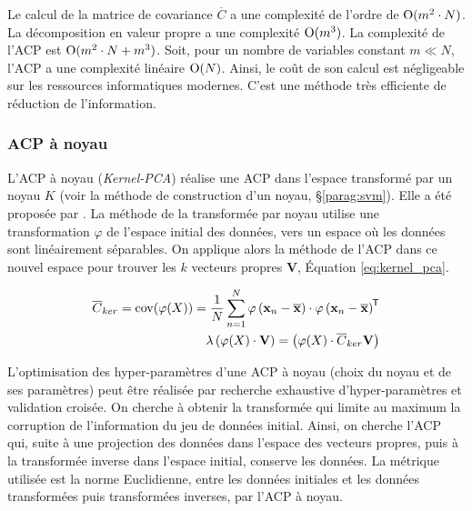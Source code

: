 Le calcul de la matrice de covariance $\overline{C}$ a une complexité de l'ordre de $\operatorname{O}(m^{2} \cdot N)$.
La décomposition en valeur propre a une complexité $\operatorname{O}(m^{3})$.
La complexité de l'ACP est $\operatorname{O}(m^{2} \cdot N+m^{3})$.
Soit, pour un nombre de variables constant $m \ll N$, l'ACP a une complexité linéaire $\operatorname{O}(N)$.
Ainsi, le coût de son calcul est négligeable sur les ressources informatiques modernes.
C'est une méthode très efficiente de réduction de l'information.

\subsubsection{ACP à noyau}\label{subsubsec:kpca}
L'ACP à noyau (\textit{Kernel-PCA}) réalise une ACP dans l'espace transformé par un noyau $K$ (voir la méthode de construction d'un noyau, §\ref{parag:svm}).
Elle a été proposée par \citeauthor{scholkopf_kernel_1997} \cite{scholkopf_kernel_1997, scholkopf_nonlinear_1998}.
La méthode de la transformée par noyau utilise une transformation $\varphi$ de l'espace initial des données, vers un espace où les données sont linéairement séparables.
On applique alors la méthode de l'ACP dans ce nouvel espace pour trouver les $k$ vecteurs propres $\mathbf{V}$, Équation \ref{eq:kernel_pca}.

\begin{equation} \label{eq:kernel_pca}
\begin{split}
\overline{C}_{ker}=\operatorname{cov}(\varphi(X))=\frac{1}{N} \sum_{n=1}^{N} \varphi\left(\mathbf{x}_{n}-\overline{\mathbf{x}}\right) \cdot \varphi\left(\mathbf{x}_{n}-\overline{\mathbf{x}}\right)^{\mkern-1.5mu\mathsf{T}}
\\
\lambda\left(\varphi(X) \cdot \mathbf{V}\right)=\left(\varphi(X) \cdot \overline{C}_{ker} \mathbf{V}\right)
\end{split}
\end{equation}

L'optimisation des hyper-paramètres d'une ACP à noyau (choix du noyau et de ses paramètres) peut être réalisée par recherche exhaustive d'hyper-paramètres et validation croisée.
On cherche à obtenir la transformée qui limite au maximum la corruption de l'information du jeu de données initial.
Ainsi, on cherche l'ACP qui, suite à une projection des données dans l'espace des vecteurs propres, puis à la transformée inverse dans l'espace initial, conserve les données.
La métrique utilisée est la norme Euclidienne, entre les données initiales et les données transformées puis transformées inverses, par l'ACP à noyau.

